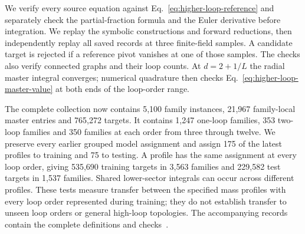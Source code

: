We verify every source equation against
Eq.~\eqref{eq:higher-loop-reference} and separately check the
partial-fraction formula and the Euler derivative before integration. We replay the symbolic constructions
and forward reductions, then independently replay all saved records
at three finite-field samples. A candidate target is rejected if a
reference pivot vanishes at one of those samples. The checks also
verify connected graphs and their loop counts. At $d=2+1/L$ the
radial master integral converges; numerical quadrature then checks
Eq.~\eqref{eq:higher-loop-master-value} at both ends of the loop-order
range.

The complete collection now contains 5,100 family instances,
21,967 family-local master entries and 765,272 targets. It contains
1,247 one-loop families, 353 two-loop families and 350 families
at each order from three through twelve. We preserve every earlier
grouped model assignment and assign 175 of the latest profiles to
training and 75 to testing. A profile has the same assignment at
every loop order, giving 535,690 training targets in 3,563 families
and 229,582 test targets in 1,537 families. Shared lower-sector integrals can occur
across different profiles. These tests measure transfer between the
specified mass profiles with every loop order represented during
training; they do not establish transfer to unseen loop orders or
general high-loop topologies. The accompanying records contain the
complete definitions and checks~\cite{HigherLoopIntegralData}.
